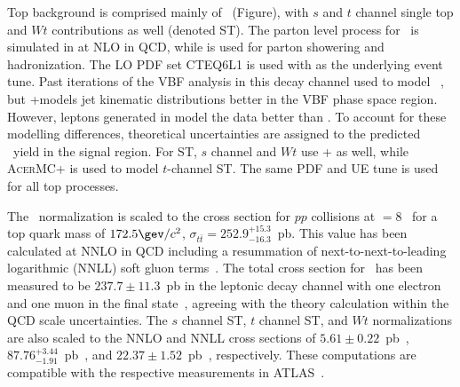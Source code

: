 
Top background is comprised mainly of \ttbar~(Figure), with $s$ and $t$
channel single top and $Wt$ contributions as well (denoted ST). The parton
level process for \ttbar~is simulated in
\POWHEG at NLO in QCD, while  is used for parton showering and
hadronization. The LO PDF set CTEQ6L1 is used with  as
the underlying event tune. Past iterations of the VBF analysis in this
decay channel used \MCATNLO to model
\ttbar~\cite{bib:hww_moriond_2013}, but \POWHEGns +\PYTHIA models jet
kinematic distributions better in the VBF phase space region. However, leptons generated in
\MCATNLO model the data better than \POWHEG. To account for these
modelling differences, theoretical uncertainties are assigned to the
predicted \ttbar~yield in the signal region. For ST,
$s$ channel and $Wt$ use \POWHEGns + as well, while
\textsc{AcerMC}+ is used to model $t$-channel ST. The same PDF
and UE tune is used for all top processes. 

The \ttbar~normalization is scaled to the cross section for $pp$
collisions at \sqrts$=8$ \tev~for a top quark mass of
$172.5 \gev/c^2$, $\sigma_{t\bar{t}}=252.9^{+15.3}_{-16.3}$~pb. This value has been
calculated at NNLO in QCD including a resummation of
next-to-next-to-leading logarithmic (NNLL) soft gluon
terms~\cite{bib:Cacciari:2011hy,bib:Beneke:2011mq,bib:Baernreuther:2012ws,bib:Czakon:2012zr,bib:Czakon:2012pz,bib:Czakon:2013goa,bib:Czakon:2011xx}.
The total cross section for \ttbar~has been measured to be
$237.7\pm11.3$~pb in the leptonic decay channel with one
electron and one muon in the final
state~\cite{bib:ttbar_cross_section}, agreeing with the
theory calculation within the QCD scale uncertainties. The $s$ channel
ST, $t$ channel ST, and $Wt$ normalizations are also scaled to the
NNLO and NNLL cross sections of $5.61\pm0.22$~pb~\cite{bib:Kidonakis:2010tc},
$87.76^{+3.44}_{-1.91}$~pb~\cite{bib:Kidonakis:2011wy}, and
$22.37\pm1.52$~pb~\cite{bib:Kidonakis:2010ux}, respectively. These
computations are compatible with the respective measurements in
ATLAS~\cite{bib:tchan_cross_section,bib:Wt_cross_section}. 


